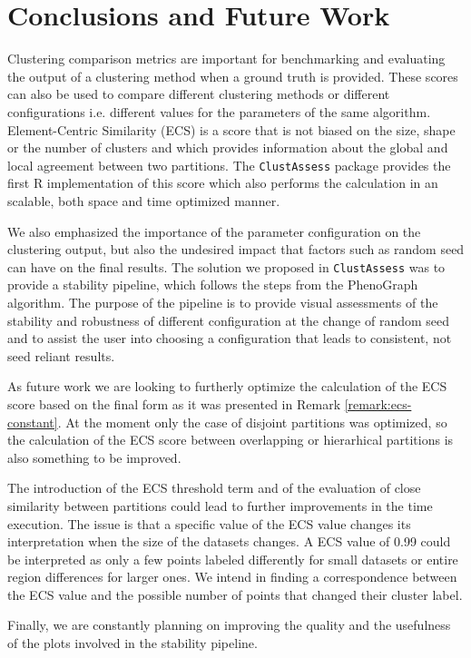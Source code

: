 \chapter*{Conclusions and Future Work} 

Clustering comparison metrics are important for benchmarking and evaluating the output of a clustering method when a ground truth is provided. These scores can also be used to compare different clustering methods or different configurations i.e. different values for the parameters of the same algorithm. Element-Centric Similarity (ECS) is a score that is not biased on the size, shape or the number of clusters and which provides information about the global and local agreement between two partitions. The \verb|ClustAssess| package provides the first R implementation of this score which also performs the calculation in an scalable, both space and time optimized manner.

We also emphasized the importance of the parameter configuration on the clustering output, but also the undesired impact that factors such as random seed can have on the final results. The solution we proposed in \verb|ClustAssess| was to provide a stability pipeline, which follows the steps from the PhenoGraph algorithm. The purpose of the pipeline is to provide visual assessments of the stability and robustness of different configuration at the change of random seed and to assist the user into choosing a configuration that leads to consistent, not seed reliant results.

As future work we are looking to furtherly optimize the calculation of the ECS score based on the final form as it was presented in Remark \ref{remark:ecs-constant}. At the moment only the case of disjoint partitions was optimized, so the calculation of the ECS score between overlapping or hierarhical partitions is also something to be improved. 

The introduction of the ECS threshold term and of the evaluation of close similarity between partitions could lead to further improvements in the time execution. The issue is that a specific value of the ECS value changes its interpretation when the size of the datasets changes. A ECS value of 0.99 could be interpreted as only a few points labeled differently for small datasets or entire region differences for larger ones. We intend in finding a correspondence between the ECS value and the possible number of points that changed their cluster label.

Finally, we are constantly planning on improving the quality and the usefulness of the plots involved in the stability pipeline.

